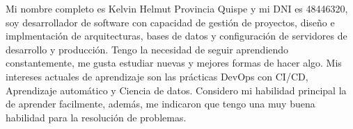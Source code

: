 
\begin{minipage}[t]{0.4\textwidth} %
	\vspace{-\baselineskip} %
	Mi nombre completo es Kelvin Helmut Provincia Quispe y mi DNI es 48446320, soy desarrollador de software con capacidad de gestión de proyectos, diseño e implmentación de arquitecturas, bases de datos y configuración de servidores de desarrollo y producción. Tengo la necesidad de seguir aprendiendo constantemente, me gusta estudiar nuevas y mejores formas de hacer algo. Mis intereses actuales de aprendizaje son las prácticas DevOps con CI/CD, Aprendizaje automático y Ciencia de datos. Considero mi habilidad principal la de aprender facilmente, además, me indicaron que tengo una muy buena habilidad para la resolución de problemas.
\end{minipage}
\hfill %
\begin{minipage}[t]{0.5\textwidth} %
	\vspace{-\baselineskip} %
	\begin{barchart}{5.5}
	\end{barchart}
\end{minipage}

\begin{center}
\end{center}